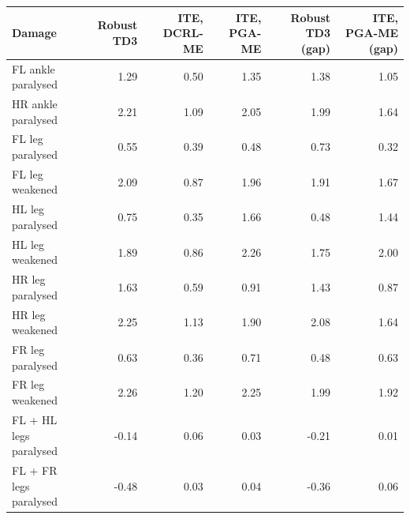 \begin{tabular}{lrrrrr}
\toprule
Damage & Robust TD3 & ITE, DCRL-ME & ITE, PGA-ME & Robust TD3 (gap) & ITE, PGA-ME (gap) \\
\midrule
FL ankle paralysed & 1.29 & 0.50 & 1.35 & 1.38 & 1.05 \\
HR ankle paralysed & 2.21 & 1.09 & 2.05 & 1.99 & 1.64 \\
FL leg paralysed & 0.55 & 0.39 & 0.48 & 0.73 & 0.32 \\
FL leg weakened & 2.09 & 0.87 & 1.96 & 1.91 & 1.67 \\
HL leg paralysed & 0.75 & 0.35 & 1.66 & 0.48 & 1.44 \\
HL leg weakened & 1.89 & 0.86 & 2.26 & 1.75 & 2.00 \\
HR leg paralysed & 1.63 & 0.59 & 0.91 & 1.43 & 0.87 \\
HR leg weakened & 2.25 & 1.13 & 1.90 & 2.08 & 1.64 \\
FR leg paralysed & 0.63 & 0.36 & 0.71 & 0.48 & 0.63 \\
FR leg weakened & 2.26 & 1.20 & 2.25 & 1.99 & 1.92 \\
FL + HL legs paralysed & -0.14 & 0.06 & 0.03 & -0.21 & 0.01 \\
FL + FR legs paralysed & -0.48 & 0.03 & 0.04 & -0.36 & 0.06 \\
\bottomrule
\end{tabular}
